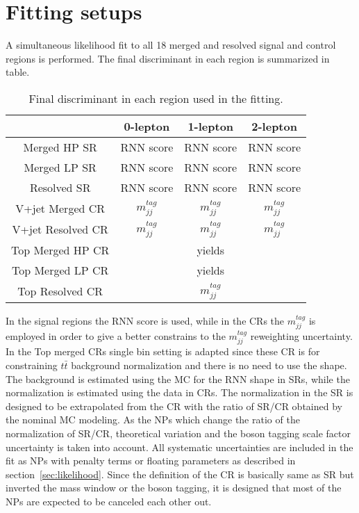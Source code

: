 \section{Fitting setups}
A simultaneous likelihood fit to all 18 merged and resolved signal and control regions is performed.
The final discriminant in each region is summarized in table.
\begin{table}[htbp]
 \footnotesize
\begin{center}
\begin{tabular}{ | c | c | c | c |} \hline
                      & 0-lepton        & 1-lepton       & 2-lepton  \\ \hline \hline
Merged HP SR          &  RNN score      &  RNN score     & RNN score     \\ \hline
Merged LP SR          &  RNN score      &  RNN score     & RNN score     \\ \hline
Resolved SR           &  RNN score      &  RNN score     & RNN score     \\ \hline \hline
V+jet Merged CR       & $m^{tag}_{jj}$  & $m^{tag}_{jj}$ & $m^{tag}_{jj}$\\ \hline 
V+jet Resolved CR     & $m^{tag}_{jj}$  & $m^{tag}_{jj}$ & $m^{tag}_{jj}$\\ \hline
Top Merged HP CR      &                 & yields         &               \\ \hline
Top Merged LP CR      &                 & yields         &               \\ \hline
Top Resolved CR       &                 & $m^{tag}_{jj}$ &               \\ \hline
\end{tabular}
\caption{\label{tab:discriminant} Final discriminant in each region used in the fitting. }
\end{center}
\end{table}
In the signal regions the RNN score is used, while in the CRs the $m^{tag}_{jj}$ is employed in order to give a better constrains to the $m^{tag}_{jj}$ reweighting uncertainty. 
In the Top merged CRs single bin setting is adapted since these CR is for constraining $t\bar{t}$ background normalization and there is no need to use the shape. 
The background is estimated using the MC for the RNN shape in SRs, while the normalization is estimated using the data in CRs.
The normalization in the SR is designed to be extrapolated from the CR with the ratio of SR/CR obtained by the nominal MC modeling.
As the NPs which change the ratio of the normalization of SR/CR, theoretical variation and the boson tagging scale factor uncertainty is taken into account.
All systematic uncertainties are included in the fit as NPs with penalty terms or floating parameters as described in section~\ref{sec:likelihood}. Since the definition of the CR is basically same as SR but inverted the mass window or the boson tagging, it is designed that most of the NPs are expected to be canceled each other out.

